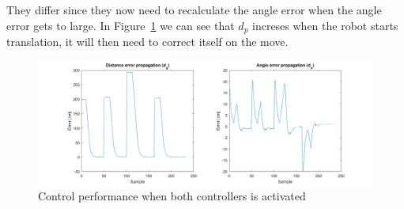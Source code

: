 They differ since they now need to recalculate the angle error when the
angle error gets to large. In Figure~\ref{fig:task17} we can see that
$d_p$ increses when the robot starts translation, it will then need to
correct itself on the move.

\begin{figure}[H]
    \centering
    \includegraphics[width=\textwidth]{../matlab/images/task17.png}
    \caption{Control performance when both controllers is activated}
    \label{fig:task17}
\end{figure}
